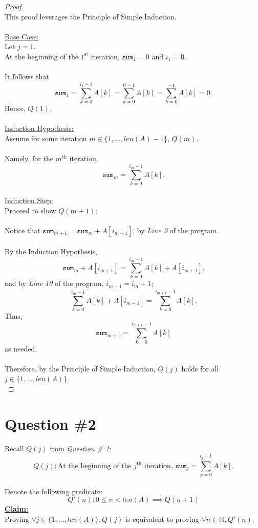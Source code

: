 \documentclass[12pt]{article}
\begin{document}
\begin{proof}
\leavevmode\\
    This proof leverages the Principle of Simple Induction. \\
    \\
    \underline{Base Case:} \\
    Let $j = 1$. \\
    At the beginning of the $1^{\text{st}}$ iteration, $\texttt{sum}_1 = 0$ and $i_1 = 0$. \\
    \\
    It follows that
    \[
    \texttt{sum}_1 = \sum_{k=0}^{i_1-1} A[k]
    = \sum_{k=0}^{0-1} A[k]
    = \sum_{k=0}^{-1} A[k]
    = 0\text{.}
    \]
    Hence, \(Q(1)\). \\
    \\
    \underline{Induction Hypothesis:} \\
    Assume for some iteration $m \in \{ 1, ..., len(A) - 1 \}$, $Q(m)$. \\
    \\
    Namely, for the $m^{\text{th}}$ iteration,
    \[\texttt{sum}_m = \sum_{k = 0}^{i_m - 1} A[k] \text{.}\]
    \\
    \underline{Induction Step:} \\
    Proceed to show \(Q(m + 1)\): \\
    \\
    Notice that \(\texttt{sum}_{m + 1} = \texttt{sum}_m + A[i_{m + 1}]\), by \textit{Line 9} of the program. \\
    \\
    By the Induction Hypothesis,
    \[
    \texttt{sum}_m + A[i_{m + 1}]
    = \sum_{k = 0}^{i_m - 1} A[k] + A[i_{m + 1}] \text{,}
    \]
    and by \textit{Line 10} of the program, \(i_{m + 1} = i_m + 1\);
    \[
    \sum_{k = 0}^{i_m - 1} A[k] + A[i_{m + 1}]
    = \sum_{k = 0}^{i_{m + 1} - 1} A[k] \text{.}
    \]
    Thus,
    \[
    \texttt{sum}_{m + 1} = \sum_{k = 0}^{i_{m + 1} - 1} A[k]
    \]
    as needed. \\
    \\
    Therefore, by the Principle of Simple Induction, $Q(j)$ holds for all $j \in \{1, \dots, len(A)\}$. \\
\end{proof}
\pagebreak
\section*{Question \#2}
Recall \(Q(j)\) from \textit{Question \# 1}: \\
\[
Q(j): \text{At the beginning of the } j^{\text{th}} \text{ iteration, } \texttt{sum}_j = \sum_{k=0}^{i_j-1} A[k].
\]
\\
Denote the following predicate:
\[
    Q'(n): 0 \leq n < len(A) \implies Q(n + 1)
\]
\textbf{\underline{Claim:}} \\
Proving $\forall j \in \{ 1, \dots, len(A) \}, Q(j)$ is equivalent to proving $\forall n \in \mathbb{N}, Q'(n)$.
\end{document}
